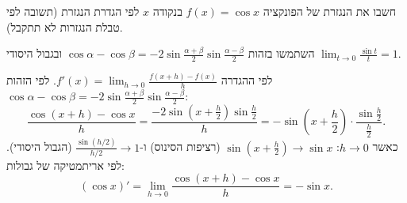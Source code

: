 
\begin{question}
חשבו את הנגזרת של הפונקציה $f(x)=\cos x$ בנקודה $x$ לפי הגדרת הנגזרת (תשובה לפי טבלת הנגזרות לא תתקבל).
\end{question}

\begin{hint}
השתמשו בזהות $\cos\alpha-\cos\beta=-2\sin\frac{\alpha+\beta}{2}\sin\frac{\alpha-\beta}{2}$ ובגבול היסודי $\lim_{t\to0}\frac{\sin t}{t}=1$.
\end{hint}

\begin{solution}
לפי ההגדרה $f'(x)=\lim_{h\to0}\frac{f(x+h)-f(x)}{h}$. לפי הזהות $\cos\alpha-\cos\beta=-2\sin\frac{\alpha+\beta}{2}\sin\frac{\alpha-\beta}{2}$:
\[
\frac{\cos(x+h)-\cos x}{h}=\frac{-2\sin\left(x+\frac h2\right)\sin\frac h2}{h}=-\sin\left(x+\frac h2\right)\cdot\frac{\sin\frac h2}{\frac h2}.
\]
כאשר $h\to0$: $\sin\left(x+\frac h2\right)\to\sin x$ (רציפות הסינוס) ו-$\frac{\sin(h/2)}{h/2}\to1$ (הגבול היסודי). לפי אריתמטיקה של גבולות:
\[
(\cos x)'=\lim_{h\to0}\frac{\cos(x+h)-\cos x}{h}=-\sin x.
\]
\end{solution}
